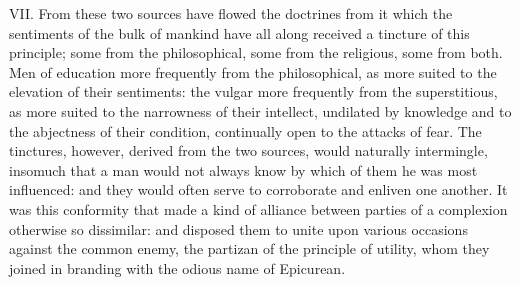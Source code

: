 \documentclass[12pt]{report}
\begin{document}
VII. From these two sources have flowed the doctrines from it which the
sentiments of the bulk of mankind have all along received a tincture of
this principle; some from the philosophical, some from the religious,
some from both. Men of education more frequently from the philosophical,
as more suited to the elevation of their sentiments: the vulgar more
frequently from the superstitious, as more suited to the narrowness of
their intellect, undilated by knowledge and to the abjectness of their
condition, continually open to the attacks of fear. The tinctures,
however, derived from the two sources, would naturally intermingle,
insomuch that a man would not always know by which of them he was most
influenced: and they would often serve to corroborate and enliven one
another. It was this conformity that made a kind of alliance between
parties of a complexion otherwise so dissimilar: and disposed them to
unite upon various occasions against the common enemy, the partizan of
the principle of utility, whom they joined in branding with the odious
name of Epicurean.
\end{document}
